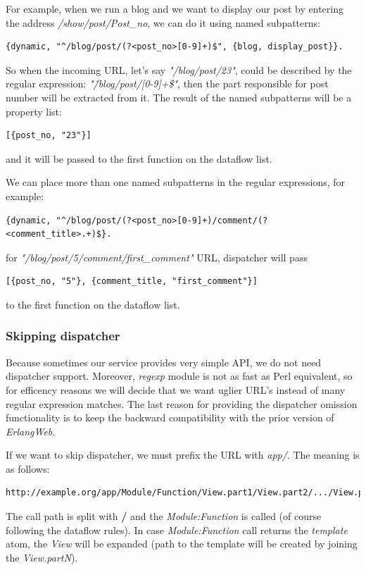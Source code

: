 For example, when we run a blog and we want to display our post by entering the address {\it /show/post/Post\_no}, we can do it using named subpatterns:
\begin{verbatim}
{dynamic, "^/blog/post/(?<post_no>[0-9]+)$", {blog, display_post}}.
\end{verbatim}
So when the incoming URL, let's say {\it "/blog/post/23"}, could be described by the regular expression: {\it "\^/blog/post/[0-9]+\$"}, 
then the part responsible for post number will be extracted from it. 
The result of the named subpatterns will be a property list: 
\begin{verbatim}
[{post_no, "23"}] 
\end{verbatim}
and it will be passed to the first function on the dataflow list.

We can place more than one named subpatterns in the regular expressions, for example:
\begin{verbatim}
{dynamic, "^/blog/post/(?<post_no>[0-9]+)/comment/(?<comment_title>.+)$}.
\end{verbatim}
for {\it "/blog/post/5/comment/first\_comment"} URL, dispatcher will pass 
\begin{verbatim}
[{post_no, "5"}, {comment_title, "first_comment"}] 
\end{verbatim}
to the first function on the dataflow list.

\subsubsection{Skipping dispatcher}
Because sometimes our service provides very simple API, we do not need dispatcher support. 
Moreover, {\it regexp} module is not as fast as Perl equivalent, 
so for efficency reasons we will decide that we want uglier URL's instead of many regular expression matches. 
The last reason for providing the dispatcher omission functionality is to keep the backward compatibility with the prior version of {\it ErlangWeb}.

If we want to skip dispatcher, we must prefix the URL with {\it app/}. 
The meaning is as follows:
\begin{Verbatim}
http://example.org/app/Module/Function/View.part1/View.part2/.../View.partN
\end{Verbatim}
The call path is split with {\bf /} and the {\it Module:Function} is called (of course following the dataflow rules). 
In case {\it Module:Function} call returns the {\it template} atom, 
the {\it View} will be expanded (path to the template will be created by joining the {\it View.partN}).

